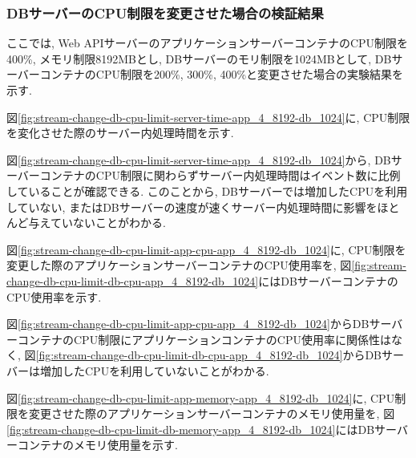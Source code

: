 \documentclass[../../../../main]{subfiles}
\begin{document}
    \subsubsection{DBサーバーのCPU制限を変更させた場合の検証結果}\label{subsubsec:result-streaming-change-db-cpu}

    ここでは, Web APIサーバーのアプリケーションサーバーコンテナのCPU制限を400\%, メモリ制限8192MBとし, DBサーバーのモリ制限を1024MBとして, DBサーバーコンテナのCPU制限を200\%, 300\%, 400\%と変更させた場合の実験結果を示す.


    図\ref{fig:stream-change-db-cpu-limit-server-time-app_4_8192-db_1024}に, CPU制限を変化させた際のサーバー内処理時間を示す.

    

    図\ref{fig:stream-change-db-cpu-limit-server-time-app_4_8192-db_1024}から, DBサーバーコンテナのCPU制限に関わらずサーバー内処理時間はイベント数に比例していることが確認できる. このことから, DBサーバーでは増加したCPUを利用していない, またはDBサーバーの速度が速くサーバー内処理時間に影響をほとんど与えていないことがわかる.


    図\ref{fig:stream-change-db-cpu-limit-app-cpu-app_4_8192-db_1024}に, CPU制限を変更した際のアプリケーションサーバーコンテナのCPU使用率を, 図\ref{fig:stream-change-db-cpu-limit-db-cpu-app_4_8192-db_1024}にはDBサーバーコンテナのCPU使用率を示す.

    

    

    図\ref{fig:stream-change-db-cpu-limit-app-cpu-app_4_8192-db_1024}からDBサーバーコンテナのCPU制限にアプリケーションコンテナのCPU使用率に関係性はなく, 図\ref{fig:stream-change-db-cpu-limit-db-cpu-app_4_8192-db_1024}からDBサーバーは増加したCPUを利用していないことがわかる.


    図\ref{fig:stream-change-db-cpu-limit-app-memory-app_4_8192-db_1024}に, CPU制限を変更させた際のアプリケーションサーバーコンテナのメモリ使用量を, 図\ref{fig:stream-change-db-cpu-limit-db-memory-app_4_8192-db_1024}にはDBサーバーコンテナのメモリ使用量を示す.

    
\end{document}
